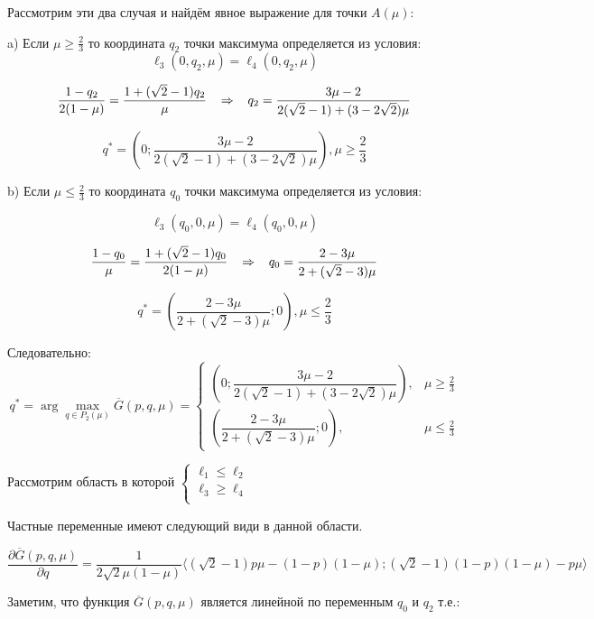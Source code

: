 \begin{flushleft}
	Рассмотрим эти два случая и найдём явное выражение для точки $A(\mu)$:

	a) Если $\mu \geqslant \frac{2}{3}$ то координата $q_2$ точки 
	максимума определяется из условия: 	
	$$\ell_3(0,q_2,\mu)=\ell_4(0,q_2,\mu)$$

	$$
	\frac{1-q_2}{2(1-\mu)}=\frac{1+(\sqrt{2} - 1)q_2}{\mu} 
	\hspace{3mm} \Rightarrow \hspace{3mm}
	q_2=\frac{3\mu-2}{2(\sqrt{2}-1)+(3-2\sqrt{2})\mu}	
	$$
	
	$$
	q^*= (0;\dfrac{3\mu-2}{2(\sqrt{2}-1)+(3-2\sqrt{2})\mu}), \mu \geqslant \frac{2}{3}
	$$


	b) Если $\mu \leqslant \frac{2}{3}$ то координата $q_0$ точки 
	максимума определяется из условия: 	
	
	$$\ell_3(q_0,0,\mu)=\ell_4(q_0,0,\mu)$$

	$$
	\frac{1-q_0}{\mu}=\frac{1+(\sqrt{2} - 1)q_0}{2(1-\mu)} 
	\hspace{3mm} \Rightarrow \hspace{3mm}
	q_0=\frac{2-3\mu}{2+(\sqrt{2}-3)\mu}	
	$$
	
	$$
	q^*= (\dfrac{2-3\mu}{2+(\sqrt{2}-3)\mu};0), \mu \leqslant \frac{2}{3}
	$$

	Следовательно:
	$$
	q^*= \arg \max \limits_{q\in P_2(\mu)} \overline G(p,q,\mu) =
	\begin{cases}
		(0;\dfrac{3\mu-2}{2(\sqrt{2}-1)+(3-2\sqrt{2})\mu}), & \mu \geqslant \frac{2}{3} \\
		(\dfrac{2-3\mu}{2+(\sqrt{2}-3)\mu};0), & \mu \leqslant \frac{2}{3}
	\end{cases}
	$$


	 Рассмотрим область в которой
	$\begin{cases}
		\ell_1 \leqslant \ell_2 \\	
		\ell_3 \geqslant \ell_4 \\
	\end{cases}	
	$
	
	Частные переменные имеют следующий види в данной области.
	
	$
	\dfrac{\partial \overline{G}(p,q,\mu)}{\partial q}=
	\dfrac{1}{2\sqrt{2}\mu(1-\mu)}
	\big \langle 
		(\sqrt{2} - 1)p\mu -(1-p)(1-\mu);
		(\sqrt{2} - 1)(1-p)(1-\mu) - p\mu			
	\big \rangle
	$

 	Заметим, что функция $\overline{G}(p,q,\mu)$
 	является линейной по переменным $q_0$ и $q_2$ т.е.:


\end{flushleft}
